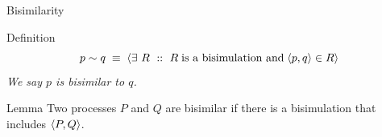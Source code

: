 \documentclass[aspectratio=169]{beamer}
\begin{document}
\begin{slide}{Bisimilarity}
\small

\begin{block}{Definition}
\centering
\[p \sim q\; \equiv\; \rcb{\exists}{R}{}{R\; \text{is a bisimulation and}\; \pair{p,q} \in R} 
\]
\emph{We say \alert{$p$ is bisimilar to $q$}.}
\end{block}


\begin{block}{Lemma}
\centering
Two processes $P$ and $Q$ are bisimilar if there is a bisimulation that includes $\mathopen{\langle}P,Q\mathclose{\rangle}$.
\end{block}


\end{slide}



\end{document}

